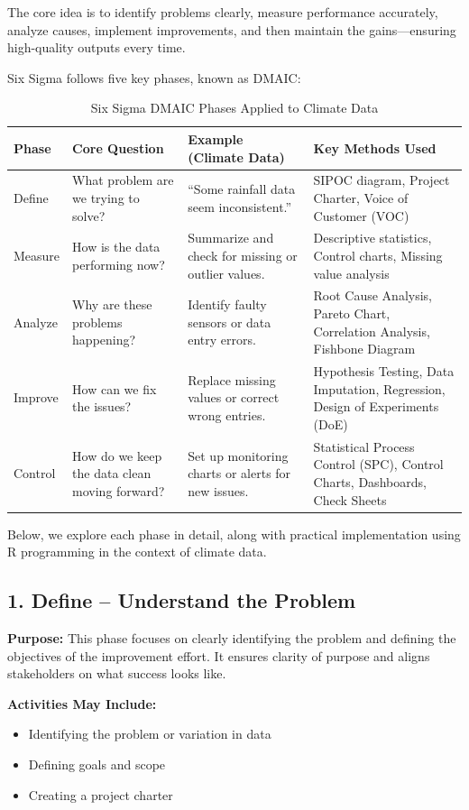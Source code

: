 The core idea is to identify problems clearly, measure performance accurately, analyze causes, implement improvements, and then maintain the gains—ensuring high-quality outputs every time.

Six Sigma follows five key phases, known as DMAIC:

\begin{table}[h!]
\centering
\begin{tabular}{|l|p{5cm}|p{4cm}|p{4cm}|}
\hline
\textbf{Phase} & \textbf{Core Question} & \textbf{Example (Climate Data)} & \textbf{Key Methods Used} \\
\hline
Define & What problem are we trying to solve? & “Some rainfall data seem inconsistent.” & SIPOC diagram, Project Charter, Voice of Customer (VOC) \\
\hline
Measure & How is the data performing now? & Summarize and check for missing or outlier values. & Descriptive statistics, Control charts, Missing value analysis \\
Analyze & Why are these problems happening? & Identify faulty sensors or data entry errors. & Root Cause Analysis, Pareto Chart, Correlation Analysis, Fishbone Diagram \\
\hline
Improve & How can we fix the issues? & Replace missing values or correct wrong entries. & Hypothesis Testing, Data Imputation, Regression, Design of Experiments (DoE) \\
\hline
Control & How do we keep the data clean moving forward? & Set up monitoring charts or alerts for new issues. & Statistical Process Control (SPC), Control Charts, Dashboards, Check Sheets \\
\hline
\end{tabular}
\caption{Six Sigma DMAIC Phases Applied to Climate Data}
\end{table}

Below, we explore each phase in detail, along with practical implementation using R programming in the context of climate data.

\subsection*{1. Define – Understand the Problem}

\textbf{Purpose:} This phase focuses on clearly identifying the problem and defining the objectives of the improvement effort. It ensures clarity of purpose and aligns stakeholders on what success looks like.

\textbf{Activities May Include:}
\begin{itemize}
  \item Identifying the problem or variation in data
  \item Defining goals and scope
  \item Creating a project charter
\end{itemize}

